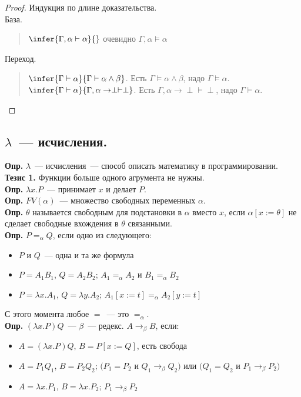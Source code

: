 \documentclass[12pt]{article}
\begin{document}
	\begin{proof}
		Индукция по длине доказательства. \\
		База.
		\begin{quote}
			$\infer{\Gamma, \alpha \vdash \alpha}{}$ очевидно $\Gamma, \alpha \vDash \alpha$
		\end{quote}
		Переход.
		\begin{quote}
			$\infer{\Gamma \vdash \alpha}{\Gamma \vdash \alpha \wedge \beta}$. Есть $\Gamma \vDash \alpha \wedge \beta$, надо $\Gamma \vDash \alpha$. \\
			$\infer{\Gamma \vdash \alpha}{\Gamma, \alpha \rightarrow \perp \vdash \perp}$. Есть $\Gamma, \alpha \rightarrow \perp \vDash \perp$, надо $\Gamma \vDash \alpha$.
		\end{quote}
	\end{proof}
	\subsection{$\lambda$~--- исчисления.}
	\textbf{Опр.} $\lambda$~--- исчисления~--- способ описать математику в программировании. \\
	\textbf{Тезис 1.} Функции больше одного агрумента не нужны. \\
	\textbf{Опр.} $\lambda x. P$~--- принимает $x$ и делает $P$. \\
	\textbf{Опр.} $FV(\alpha)$~--- множество свободных переменных $\alpha$. \\
	\textbf{Опр.} $\theta$ называется свободным для подстановки в $\alpha$ вместо $x$, если $\alpha [x := \theta]$ не сделает свободные вхождения в $\theta$ связанными. \\
	\textbf{Опр.} $P =_{\alpha} Q$, если одно из следующего:
	\begin{itemize}
		\item $P$ и $Q$~--- одна и та же формула
		\item $P = A_1 B_1$, $Q = A_2 B_2$; $A_1 =_{\alpha} A_2$ и $B_1 =_{\alpha} B_2$
		\item $P = \lambda x. A_1$, $Q = \lambda y. A_2$; $A_1[x := t] =_{\alpha} A_2 [y := t]$
	\end{itemize}
	С этого момента любое $=$~--- это $=_{\alpha}$. \\
	\textbf{Опр.} $(\lambda x. P)Q$~--- $\beta$~--- редекс. $A \rightarrow_{\beta} B$, если:
	\begin{itemize}
		\item $A = (\lambda x. P)Q$, $B = P[x := Q]$, есть свобода
		\item $A = P_1Q_1$, $B = P_2Q_2$; $(P_1 = P_2$ и $Q_1 \rightarrow_{\beta} Q_2)$ или $(Q_1 = Q_2$ и $P_1 \rightarrow_{\beta} P_2)$
		\item $A = \lambda x. P_1$, $B = \lambda x. P_2$; $P_1 \rightarrow_{\beta} P_2$
	\end{itemize}
\end{document}
